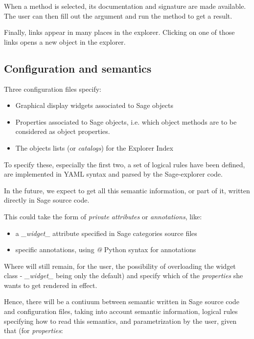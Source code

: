 \documentclass{deliverablereport}
\begin{document}
When a method is selected, its documentation and signature are made
available. The user can then fill out the argument and run the method
to get a result.

Finally, links appear in many places in the explorer. Clicking on one
of those links opens a new object in the explorer.

\subsection{Configuration and semantics}
\label{semantics}

Three configuration files specify:

\begin{itemize}
\item Graphical display widgets associated to Sage objects
  \item Properties associated to Sage objects, i.e. which object methods are
    to be considered as object properties.
\item The objects lists (or \emph{catalogs}) for the Explorer Index
\end{itemize}

To specify these, especially the first two, a set of logical rules
have been defined, are implemented in YAML syntax and parsed by the
Sage-explorer code.

In the future, we expect to get all this semantic information, or part of it,
written directly in Sage source code.

This could take the form of \emph{private attributes} or \emph{annotations}, like:

\begin{itemize}
\item a \emph{\_widget\_} attribute specified in Sage categories source files
\item specific annotations, using \emph{@} Python syntax for annotations
  \end{itemize}

Where will still remain, for the user, the possibility of overloading
the widget class - \emph{\_widget\_} being only the default) and
specify which of the \emph{properties} she wants to get rendered in effect.

Hence, there will be a contiuum between semantic written in Sage
source code and configuration files, taking into account semantic
information, logical rules specifying how to read this semantics, and
parametrization by the user, given that (for \emph{properties}:
\end{document}
